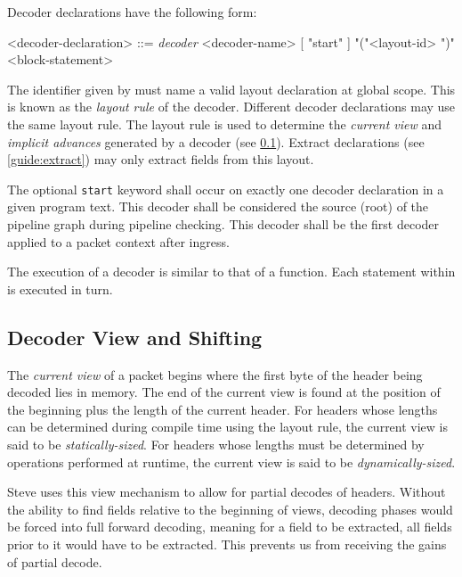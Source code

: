 Decoder declarations have the following form:

\begin{minip}
\begin{grammar}
<decoder-declaration> ::=
\textit{decoder} <decoder-name> [ "start" ]
"("<layout-id> ")" 
<block-statement>
\end{grammar}
\end{minip}

The identifier given by  must name a valid layout declaration at global scope. This  is known as the \textit{layout rule} of the decoder. Different decoder declarations may use the same layout rule. The layout rule is used to determine the \textit{current view} and \textit{implicit advances} generated by a decoder (see \ref{guide:decoder_view}). Extract declarations (see \ref{guide:extract}) may only extract fields from this layout.

The optional \texttt{start} keyword shall occur on exactly one decoder declaration in a given program text. This decoder shall be considered the source (root) of the pipeline graph during pipeline checking. This decoder shall be the first decoder applied to a packet context after ingress.

The execution of a decoder is similar to that of a function. Each statement within  is executed in turn.

\subsection{Decoder View and Shifting} \label{guide:decoder_view}

The \textit{current view} of a packet begins where the first byte of the header being decoded lies in memory. The end of the current view is found at the position of the beginning plus the length of the current header. For headers whose lengths can be determined during compile time using the layout rule, the current view is said to be \textit{statically-sized}. For headers whose lengths must be determined by operations performed at runtime, the current view is said to be \textit{dynamically-sized}.

Steve uses this view mechanism to allow for partial decodes of headers. Without the ability to find fields relative to the beginning of views, decoding phases would be forced into full forward decoding, meaning for a field to be extracted, all fields prior to it would have to be extracted. This prevents us from receiving the gains of partial decode.

